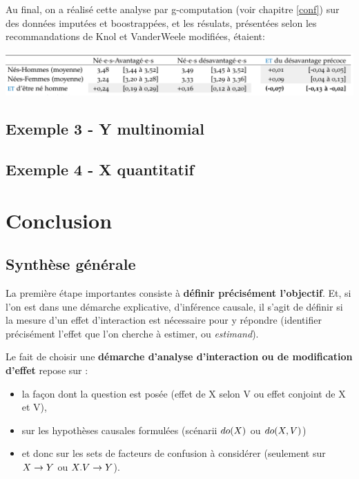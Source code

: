 \documentclass[
]{book}
\providecommand{\tightlist}{%
  \setlength{\itemsep}{0pt}\setlength{\parskip}{0pt}}
\begin{document}
Au final, on a réalisé cette analyse par g-computation (voir chapitre \ref{conf}) sur des données imputées et boostrappées, et les résulats, présentées selon les recommandations de Knol et VanderWeele modifiées, étaient:

\includegraphics[width=1\textwidth,height=\textheight]{img/result_quanti.png}

\hypertarget{exemple-3---y-multinomial}{%
\chapter{Exemple 3 - Y multinomial}\label{exemple-3---y-multinomial}}

\hypertarget{exemple-4---x-quantitatif}{%
\chapter{Exemple 4 - X quantitatif}\label{exemple-4---x-quantitatif}}

\hypertarget{part-conclusion}{%
\part{Conclusion}\label{part-conclusion}}

\hypertarget{synthuxe8se-guxe9nuxe9rale}{%
\chapter{Synthèse générale}\label{synthuxe8se-guxe9nuxe9rale}}

La première étape importantes consiste à \textbf{définir précisément l'objectif}. Et, si l'on est dans une démarche explicative, d'inférence causale, il s'agit de définir si la mesure d'un effet d'interaction est nécessaire pour y répondre (identifier précisément l'effet que l'on cherche à estimer, ou \emph{estimand}).

Le fait de choisir une \textbf{démarche d'analyse d'interaction ou de modification d'effet} repose sur :

\begin{itemize}
\tightlist
\item
  la façon dont la question est posée (effet de X selon V ou effet conjoint de X et V),
\item
  sur les hypothèses causales formulées (scénarii \(\small do(X)\) ou \(\small do(X,V)\))
\item
  et donc sur les sets de facteurs de confusion à considérer (seulement sur \(\small X \rightarrow Y\) ou \(\small X.V \rightarrow Y\)).
\end{itemize}
\end{document}
